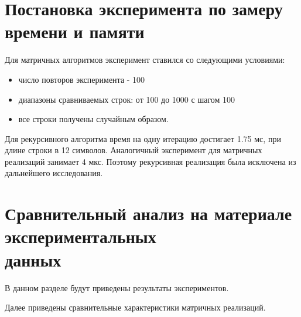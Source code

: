 \FloatBarrier

\section{Постановка эксперимента по замеру времени и памяти}

Для матричных алгоритмов эксперимент ставился со следующими условиями:
\begin{itemize}
    \item число повторов эксперимента - 100
    \item диапазоны сравниваемых строк: от 100 до 1000 с шагом 100
    \item все строки получены случайным образом.
\end{itemize}

Для рекурсивного алгоритма время на одну итерацию достигает 1.75 мс, при длине строки в 12 символов. Аналогичный эксперимент для матричных реализаций занимает
4 мкс. Поэтому рекурсивная реализация была исключена из дальнейшего исследования.

\section{Сравнительный анализ на материале экспериментальных\\ данных}

В данном разделе будут приведены результаты экспериментов.

Далее приведены сравнительные характеристики матричных реализаций.


